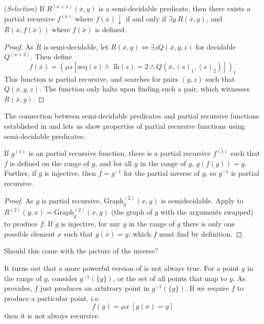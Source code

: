 \begin{theorem}{(\textit{Selection})}\label{selection}
If $R^{(n+1)}(\overline{x}, y)$ is a semi-decidable predicate, then there exists a partial recursive $f^{(n)}$ where $f(\overline{x}) \downarrow$ if and only if $\exists y \ R(\overline{x}, y)$, and $R(\overline{x},f(\overline{x}))$ where $f(\overline{x})$ is defined.
\end{theorem}
\begin{proof}
As $R$ is semi-decidable, let $R(\overline{x}, y) \iff \exists z Q(\overline{x}, y, z)$ for decidable $Q^{(n+2)}$. Then define \[
    f(\overline{x}) = \left(\mu s \left[ \text{seq}(s) \land \text{ lh}(s) = 2 \land Q(\overline{x}, (s)_1, (s)_2) \right]\right)_1
\]
This function is partial recursive, and searches for pairs $(y, z)$ such that $Q(\overline{x}, y, z)$. The function only halts upon finding such a pair, which witnesses $R(\overline{x}, y)$.
\end{proof}

The connection between semi-decidable predicates and partial recursive functions established in  and  lets us show properties of partial recursive functions using semi-decidable predicates:
\begin{corollary}\label{partial-inverse}
If $g^{(1)}$ is an partial recursive function, there is a partial recursive $f^{(1)}$ such that $f$ is defined on the range of $g$, and for all $y$ in the range of $g$, $g(f(y)) = y$. Further, if $g$ is injective, then $f = g^{-1}$ for the partial inverse of $g$, so $g^{-1}$ is partial recursive.
\end{corollary}
\begin{proof}
As $g$ is partial recursive, $\text{Graph}_g^{(2)}(x, y)$ is semidecidable. Apply  to $R^{(2)}(y, x) = \text{Graph}_g^{(2)}(x, y)$ (the graph of $g$ with the arguments swapped) to produce $f$. If $g$ is injective, for any $y$ in the range of $g$ there is only one possible element $x$ such that $g(x) = y$, which $f$ must find by definition.
\end{proof}

Should this come with the picture of the inverse?

It turns out that a more powerful version of  is not always true. For a point $y$ in the range of $g$, consider $g^{-1}(\{y\})$, or the set of all points that map to $y$. As  provides, $f$ just produces an arbitrary point in $g^{-1}(\{y\})$. If we require $f$ to produce a particular point, i.e. \[
f(y) = \mu x \ \left[ g(x) = y \right]
\] then it is not always recursive.

